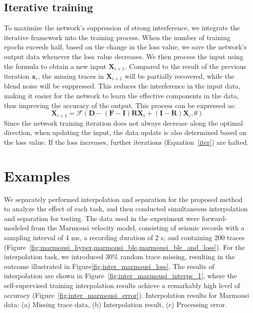 \documentclass{segabs}
\begin{document}
\subsection{Iterative training}
To maximize the network's suppression of strong interference, we integrate the iterative framework into the training process. When the number of training epochs exceeds half, based on the change in the loss value, we save the network's output data whenever the loss value decreases. We then process the input using the formula to obtain a new input $\mathbf{X}_{i+1}$. Compared to the result of the previous iteration $\mathbf{x}_{i}$, the missing traces in $\mathbf{X}_{i+1}$ will be partially recovered, while the blend noise will be suppressed. This reduces the interference in the input data, making it easier for the network to learn the effective components in the data, thus improving the accuracy of the output. This process can be expressed as:
\begin{equation}\label{iter}
\mathbf{X}_{i+1} = \mathcal{F}(\mathbf{D}-(\mathbf{F}-\mathbf{I})\mathbf{R}\mathbf{X}_{i}+(\mathbf{I}-\mathbf{R})\mathbf{X}_{i},\theta)
\end{equation}
Since the network training iteration does not always decrease along the optimal direction, when updating the input, the data update is also determined based on the loss value. If the loss increases, further iterations (Equation~\ref{iter}) are halted.

\section{Examples}
We separately performed interpolation and separation for the proposed method to analyze the effect of each task, and then conducted simultaneous interpolation and separation for testing. The data used in the experiment were forward-modeled from the Marmousi velocity model, consisting of seismic records with a sampling interval of 4 ms, a recording duration of 2 s, and containing 200 traces (Figure~\ref{fig:marmousi_hyper,marmousi_ble,marmousi_ble_and_loss}). 
For the interpolation task, we introduced 30\% random trace missing, resulting in the outcome illustrated in Figure\ref{fig:inter_marmousi_loss}. The results of interpolation are shown in Figure~\ref{fig:inter_marmousi_interps_1}, where the self-supervised training interpolation results achieve a remarkably high level of accuracy (Figure~\ref{fig:inter_marmousi_error}).
{Interpolation results for Marmousi data:
(a) Missing trace data,
(b) Interpolation result,
(c) Processing error.}
\end{document}
